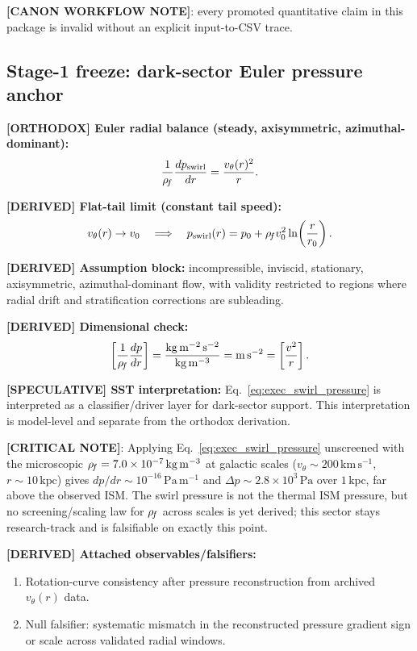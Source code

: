 \textbf{[CANON WORKFLOW NOTE]}: every promoted quantitative claim in this package is invalid without an explicit input-to-CSV trace.

\subsection{Stage-1 freeze: dark-sector Euler pressure anchor}
\textbf{[ORTHODOX] Euler radial balance (steady, axisymmetric, azimuthal-dominant):}
\begin{align}
    \frac{1}{\rho_{\!f}}\frac{dp_{\mathrm{swirl}}}{dr}
    =
    \frac{v_\theta(r)^2}{r}.
    \label{eq:exec_swirl_pressure}
\end{align}

\textbf{[DERIVED] Flat-tail limit (constant tail speed):}
\begin{align}
    v_\theta(r)\to v_0
    \quad\Longrightarrow\quad
    p_{\mathrm{swirl}}(r)
    =
    p_0 + \rho_{\!f} v_0^2\ln\!\left(\frac{r}{r_0}\right).
\end{align}

\textbf{[DERIVED] Assumption block:}
incompressible, inviscid, stationary, axisymmetric, azimuthal-dominant flow, with validity restricted to regions where radial drift and stratification corrections are subleading.

\textbf{[DERIVED] Dimensional check:}
\[
\left[\frac{1}{\rho_{\!f}}\frac{dp}{dr}\right]
=
\frac{\mathrm{kg\,m^{-2}\,s^{-2}}}{\mathrm{kg\,m^{-3}}}
=
\mathrm{m\,s^{-2}}
=
\left[\frac{v^2}{r}\right].
\]

\textbf{[SPECULATIVE] SST interpretation:}
Eq.~\eqref{eq:exec_swirl_pressure} is interpreted as a classifier/driver layer for dark-sector support. This interpretation is model-level and separate from the orthodox derivation.

\textbf{[CRITICAL NOTE]}: Applying Eq.~\eqref{eq:exec_swirl_pressure} unscreened with the microscopic $\rho_{\!f}=7.0\times10^{-7}\,\mathrm{kg\,m^{-3}}$ at galactic scales ($v_\theta\sim200\,\mathrm{km\,s^{-1}}$, $r\sim10\,\mathrm{kpc}$) gives $dp/dr\sim10^{-16}\,\mathrm{Pa\,m^{-1}}$ and $\Delta p\sim2.8\times10^{3}\,\mathrm{Pa}$ over $1\,\mathrm{kpc}$, far above the observed ISM. The swirl pressure is not the thermal ISM pressure, but no screening/scaling law for $\rho_{\!f}$ across scales is yet derived; this sector stays research-track and is falsifiable on exactly this point.

\textbf{[DERIVED] Attached observables/falsifiers:}
\begin{enumerate}
    \item Rotation-curve consistency after pressure reconstruction from archived $v_\theta(r)$ data.
    \item Null falsifier: systematic mismatch in the reconstructed pressure gradient sign or scale across validated radial windows.
\end{enumerate}

